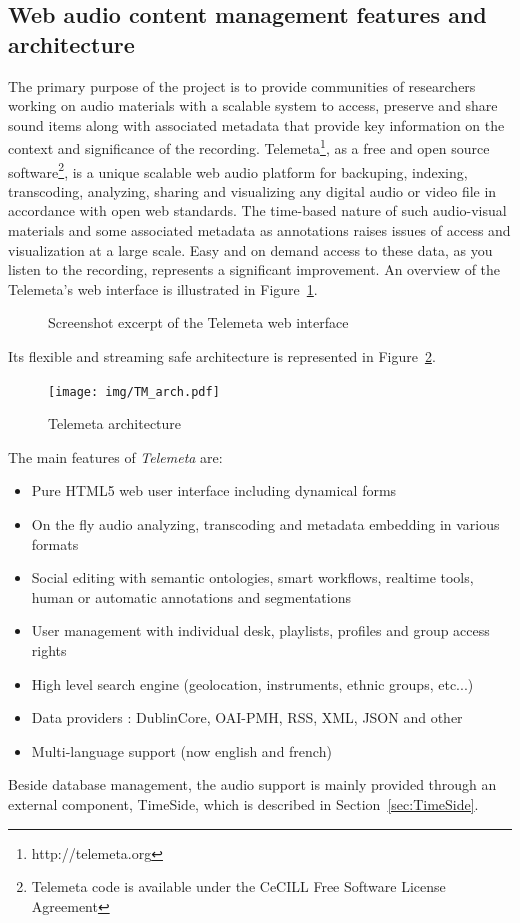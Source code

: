 \documentclass{sig-alternate}
\begin{document}
 \subsection{Web audio content management features and architecture}
The primary purpose of the project is to provide communities of researchers working on audio materials with a scalable system to access, preserve and share sound items along with associated metadata that provide key information on the context and significance of the recording.
Telemeta\footnote{http://telemeta.org}, as a free and open source software\footnote{Telemeta code is available under the CeCILL Free Software License Agreement}, is a unique scalable web audio platform for backuping, indexing, transcoding, analyzing, sharing and visualizing any digital audio or video file in accordance with open web standards.
The time-based nature of such audio-visual materials and some associated metadata as annotations raises issues of access and visualization at a large scale. Easy and on demand access to these data, as you listen to the recording, represents a significant improvement.
An overview of the Telemeta's web interface is illustrated in Figure~\ref{fig:Telemeta}.
\begin{figure}[htb]
   \centering
   \caption[1]{Screenshot excerpt of the Telemeta web interface}
    \label{fig:Telemeta}
 \end{figure}
Its flexible and streaming safe architecture is represented in Figure~\ref{fig:TM_arch}.
\begin{figure}[htbp]
  \centering
  \texttt{[image: img/TM\_arch.pdf]}
  \caption{Telemeta architecture}\label{fig:TM_arch}
\end{figure}
The main features of \emph{Telemeta} are:
      \begin{itemize}
      \item Pure HTML5 web user interface including dynamical forms
      \item On the fly audio analyzing, transcoding and metadata
        embedding in various formats
      \item Social editing with semantic ontologies, smart workflows,
        realtime tools, human or automatic annotations and
        segmentations
      \item User management with individual desk, playlists, profiles
        and group access rights
      \item High level search engine (geolocation, instruments, ethnic groups, etc...)
      \item Data providers : DublinCore, OAI-PMH, RSS, XML, JSON and other 
      \item Multi-language support (now english and french)
      \end{itemize}
Beside database management, the audio support is mainly provided through an external component, TimeSide, which is described in Section~\ref{sec:TimeSide}.
\end{document}
